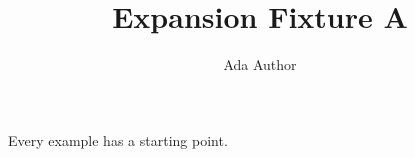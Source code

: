 \title{Expansion Fixture A}\author{Ada Author}
\begin{theorem}\label{main}Every example has a starting point.\end{theorem}
\cite{b}\cite{c}

